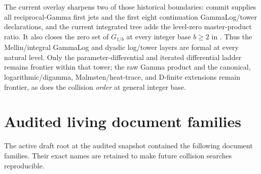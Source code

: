\documentclass[11pt]{article}
\theoremstyle{definition}
\theoremstyle{remark}
\begin{document}
The current overlay sharpens two of those historical boundaries:
commit  supplies all reciprocal-Gamma first jets and the
first eight continuation GammaLog/tower declarations, and the current
integrated tree adds the level-zero master-product ratio.  It also closes the
zero set of \(G_{1/b}\) at every integer base \(b\ge2\) in
.  Thus the
Mellin/integral GammaLog and dyadic log/tower layers are formal at every natural
level.  Only the parameter-differential and iterated differential ladder remains
frontier within that tower; the raw Gamma product and the canonical,
logarithmic/digamma, Malmsten/heat-trace, and D-finite extensions remain frontier,
as does the collision \emph{order} at general integer base.

\appendix

\section{Audited living document families}
\label{p2:app:sources}

The active draft root at the audited snapshot contained the following document families.
Their exact names are retained to make future collision searches reproducible.
\end{document}
